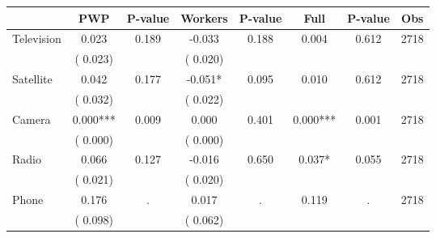
\begin{tabular}{l*{7}{c}}\hline&\multicolumn{1}{c}{PWP}&\multicolumn{1}{c}{P-value}&\multicolumn{1}{c}{Workers}&\multicolumn{1}{c}{P-value}&\multicolumn{1}{c}{Full}&\multicolumn{1}{c}{P-value}&\multicolumn{1}{c}{Obs} \\ \hline

 Television       &              0.023       &        0.189  &             -0.033       &        0.188  &              0.004       &              0.612 &  2718 \\ 
                       &       (       0.023)             &                               &       (       0.020)                     &                               &                                               &                                &                      \\ 

 Satellite       &              0.042       &        0.177  &             -0.051*       &        0.095  &              0.010       &              0.612 &  2718 \\ 
                       &       (       0.032)             &                               &       (       0.022)                     &                               &                                               &                                &                      \\ 

 Camera       &              0.000***       &        0.009  &              0.000       &        0.401  &              0.000***       &              0.001 &  2718 \\ 
                       &       (       0.000)             &                               &       (       0.000)                     &                               &                                               &                                &                      \\ 

 Radio       &              0.066       &        0.127  &             -0.016       &        0.650  &              0.037*       &              0.055 &  2718 \\ 
                       &       (       0.021)             &                               &       (       0.020)                     &                               &                                               &                                &                      \\ 

 Phone       &              0.176       &            .  &              0.017       &            .  &              0.119       &                  . &  2718 \\ 
                       &       (       0.098)             &                               &       (       0.062)                     &                               &                                               &                                &                      \\ 

\hline \end{tabular}